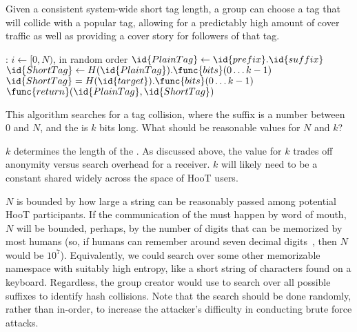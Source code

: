 Given a consistent system-wide short tag length, a group can choose a
tag that will collide with a popular tag, allowing for a predictably
high amount of cover traffic as well as providing a cover story for
followers of that tag.
%
\begin{codebox}
:
\zi \For $i \gets [0,N)$, in random order
\zi \Do
\zi $\id{PlainTag} \gets  \id{prefix}.\id{suffix}$
\zi $\id{ShortTag} \gets H(\id{PlainTag}).\func{bits}(0 \ldots k-1)$
\zi \If $\id{ShortTag} = H(\id{target}).\func{bits}(0 \ldots k-1)$
\zi \Then $\func{return} (\id{PlainTag} , \id{ShortTag})$
\zi \End
\End
\end{codebox}

%
This algorithm searches for a tag collision, where the  suffix is
a number between 0 and $N$, and the  is $k$ bits long.
What should be reasonable values for $N$ and $k$?

$k$ determines the length of the . As discussed above, the value for $k$
trades off anonymity versus search overhead for a receiver. $k$ will likely need to be
a constant shared widely across the space of HooT users.

$N$ is bounded by how large a  string can be reasonably
passed among potential HooT participants. If the communication of the
 must happen by word of mouth, $N$ will be bounded,
perhaps, by the number of digits that can be memorized by most humans
(so, if humans can remember around seven decimal
digits~\cite{miller56}, then $N$ would be $10^7$). Equivalently, we
could search over some other memorizable namespace with suitably high
entropy, like a short string of characters found on a keyboard.
Regardless, the group creator would use  to search over all possible suffixes to
identify hash collisions. Note that the search should be done
randomly, rather than in-order, to increase the attacker's difficulty
in conducting brute force attacks. 

